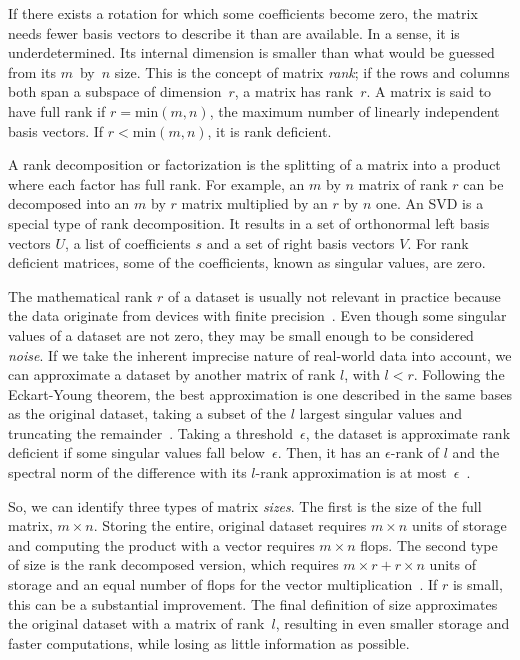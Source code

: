 \documentclass[ijgi,article,submit,moreauthors,pdftex,10pt,a4paper]{Definitions/mdpi}
\begin{document}
If there exists a rotation for which some coefficients become zero, the matrix needs fewer basis vectors to describe it than are available. In a sense, it is underdetermined. Its internal dimension is smaller than what would be guessed from its $m$~by~$n$ size. This is the concept of matrix \textit{rank}; if the rows and columns both span a subspace of dimension~$r$, a matrix has rank~$r$. A matrix is said to have full rank if $r = \text{min}(m, n)$, the maximum number of linearly independent basis vectors. If $r < \text{min}(m, n)$, it is rank deficient.

A rank decomposition or factorization is the splitting of a matrix into a product where each factor has full rank. For example, an $m$ by $n$ matrix of rank $r$ can be decomposed into an $m$ by $r$ matrix multiplied by an $r$ by $n$ one. %
An SVD is a special type of rank decomposition. It results in a set of orthonormal left basis vectors $U$, a list of coefficients $s$ and a set of right basis vectors $V$. For rank deficient matrices, some of the coefficients, known as singular values, are zero.

The mathematical rank $r$ of a dataset is usually not relevant in practice because the data originate from devices with finite precision~\cite{Martinsson2016}. Even though some singular values of a dataset are not zero, they may be small enough to be considered \textit{noise}. If we take the inherent imprecise nature of real-world data into account, we can approximate a dataset by another matrix of rank $l$, with $l < r$. Following the Eckart-Young theorem, the best approximation is one described in the same bases as the original dataset, taking a subset of the $l$ largest singular values and truncating the remainder~\cite{Eckart1936}. Taking a threshold~$\epsilon$, the dataset is approximate rank deficient if some singular values fall below~$\epsilon$. Then, it has an $\epsilon$-rank of $l$ and the spectral norm of the difference with its $l$-rank approximation is at most~$\epsilon$~\cite{Martinsson2016}.

So, we can identify three types of matrix \textit{sizes}. The first is the size of the full matrix, $m \times n$. Storing the entire, original dataset requires $m \times n$ units of storage and computing the product with a vector requires $m \times n$ flops. The second type of size is the rank decomposed version, which requires $m \times r + r \times n$ units of storage and an equal number of flops for the vector multiplication~\cite{Martinsson2016}. If $r$ is small, this can be a substantial improvement. The final definition of size approximates the original dataset with a matrix of rank~$l$, resulting in even smaller storage and faster computations, while losing as little information as possible.
\end{document}
